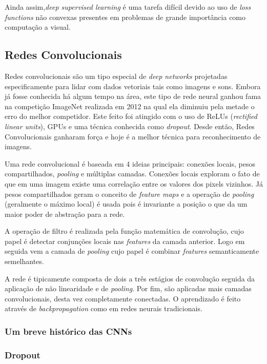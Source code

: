 Ainda assim,\emph{deep supervised learning} é uma tarefa difícil devido ao uso
de \emph{loss functions} não convexas presentes em problemas de grande
importância como computação a visual.

\subsection{Redes Convolucionais}

Redes convolucionais são um tipo especial de \emph{deep networks} projetadas
especificamente para lidar com dados vetoriais tais como imagens e sons.
Embora já fosse conhecida há algum tempo na área, este tipo de rede neural
ganhou fama na competição ImageNet realizada em 2012 na qual ela diminuiu pela
metade o erro do melhor competidor. Este feito foi atingido com o uso de ReLUs
(\emph{rectified linear units}), GPUs e uma técnica conhecida como
\emph{dropout}. Desde então, Redes Convolucionais ganharam força e hoje é a
melhor técnica para reconhecimento de imagens.\cite{lecun2015deep}

Uma rede convolucional é baseada em 4 ideias principais: conexões locais, pesos
compartilhados, \emph{pooling} e múltiplas camadas. Conexões locais exploram o
fato de que em uma imagem existe uma correlação entre os valores dos pixels
vizinhos. Já pesos compartilhados geram o conceito de \emph{feature maps} e a
operação de \emph{pooling} (geralmente o máximo local) é usada pois é
invariante a posição o que da um maior poder de abstração para a
rede.\cite{lecun2015deep}

A operação de filtro é realizada pela função matemática de convolução, cujo
papel é detectar conjunções locais nas \emph{features} da camada anterior. Logo
em seguida vem a camada de \emph{pooling} cujo papel é combinar \emph{features}
semanticamente semelhantes.\cite{lecun2015deep}

A rede é tipicamente composta de dois a três estágios de convolução seguida da
aplicação de não linearidade e de \emph{pooling}. Por fim, são aplicadas mais
camadas convolucionais, desta vez completamente conectadas. O aprendizado é
feito através de \emph{backpropagation} como em redes neurais
tradicionais.\cite{lecun2015deep}

\subsubsection{Um breve histórico das CNNs}

\subsubsection{Dropout}

